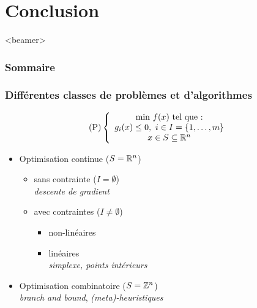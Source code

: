 \documentclass{beamer}
\newcommand{\Z}{{\ensuremath\mathbb{Z}}}
\newcommand{\R}{{\ensuremath\mathbb{R}}}
\begin{document}
\section{Conclusion}

\begin{frame}<beamer>
  \frametitle{Sommaire}
  \tableofcontents[currentsection]
\end{frame}

\begin{frame}
  \frametitle{Différentes classes de problèmes et d'algorithmes}

  \[
  \text{(P)} \left\{
  \begin{array}{c}
    \text{min} \ f(x) \ \text{tel que :} \\
    g_i(x) \leq 0, \ i \in I = \{1, \dots, m\} \\
    x \in S \subseteq \R^n
  \end{array}
  \right.
  \]

  \begin{itemize}
  \item Optimisation continue ($S = \R^n$)
    \begin{itemize}
    \item sans contrainte ($I = \emptyset$) \\
      \emph{descente de gradient}
    \item avec contraintes ($I \neq \emptyset$) 
      \begin{itemize}
        \item non-linéaires
        \item linéaires \\
        \emph{simplexe, points intérieurs}
      \end{itemize}
    \end{itemize}
  \item Optimisation combinatoire ($S = \Z^n$)\\
    \emph{branch and bound}, \emph{(meta)-heuristiques} 
  \end{itemize}
  
\end{frame}
\end{document}
